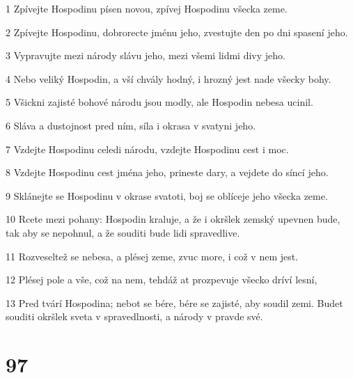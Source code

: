 \par 1 Zpívejte Hospodinu písen novou, zpívej Hospodinu všecka zeme.
\par 2 Zpívejte Hospodinu, dobrorecte jménu jeho, zvestujte den po dni spasení jeho.
\par 3 Vypravujte mezi národy slávu jeho, mezi všemi lidmi divy jeho.
\par 4 Nebo veliký Hospodin, a vší chvály hodný, i hrozný jest nade všecky bohy.
\par 5 Všickni zajisté bohové národu jsou modly, ale Hospodin nebesa ucinil.
\par 6 Sláva a dustojnost pred ním, síla i okrasa v svatyni jeho.
\par 7 Vzdejte Hospodinu celedi národu, vzdejte Hospodinu cest i moc.
\par 8 Vzdejte Hospodinu cest jména jeho, prineste dary, a vejdete do síncí jeho.
\par 9 Sklánejte se Hospodinu v okrase svatoti, boj se oblíceje jeho všecka zeme.
\par 10 Rcete mezi pohany: Hospodin kraluje, a že i okršlek zemský upevnen bude, tak aby se nepohnul, a že souditi bude lidi spravedlive.
\par 11 Rozveseltež se nebesa, a plésej zeme, zvuc more, i což v nem jest.
\par 12 Plésej pole a vše, což na nem, tehdáž at prozpevuje všecko dríví lesní,
\par 13 Pred tvárí Hospodina; nebot se bére, bére se zajisté, aby soudil zemi. Budet souditi okršlek sveta v spravedlnosti, a národy v pravde své.

\chapter{97}

